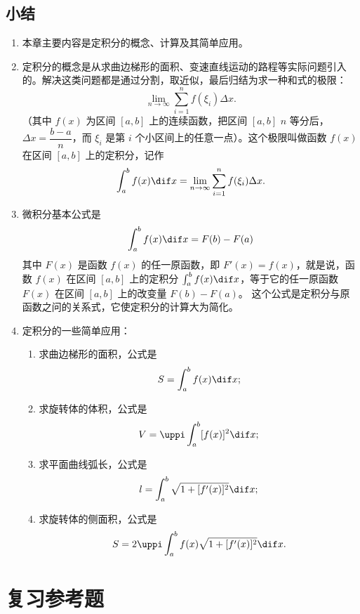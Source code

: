 \section*{小结}
\begin{enumerate}[C、,itemindent=4.5em]
  \item 本章主要内容是定积分的概念、计算及其简单应用。
  \item 定积分的概念是从求曲边梯形的面积、变速直线运动的路程等实际问题引入的。解决这类问题都是通过分割，取近似，最后归结为求一种和式的极限：
  \[ \lim_{n \to \infty}\sum_{i=1}^{n} f(\xi_i)\Delta x. \]
  （其中 $f(x)$ 为区间 $[a,b]$ 上的连续函数，把区间 $[a,b]$ $n$ 等分后，$\Delta x= \dfrac{b-a}{n}$，而 $\xi_i$ 是第 $i$ 个小区间上的任意一点）。这个极限叫做函数 $f(x)$ 在区间 $[a,b]$ 上的定积分，记作
  \[\int_a^b f(x)\dif x=\lim_{n\to\infty}\sum_{i=1}^{n} f(\xi_i)\Delta x.\]
  \item 微积分基本公式是
  \[\int_a^b f(x) \dif x= F(b)-F(a)\]
  其中 $F(x)$ 是函数 $f(x)$ 的任一原函数，即 $F'(x)=f(x)$，就是说，函数 $f(x)$ 在区间 $[a,b]$ 上的定积分 $\int_a^b f(x)\dif x$，等于它的任一原函数 $F(x)$ 在区间 $[a,b]$ 上的改变量 $F(b)-F(a)$。
  这个公式是定积分与原函数之问的关系式，它使定积分的计算大为简化。
  \item 定积分的一些简单应用：
  \begin{enumerate}[1.]
    \item 求曲边梯形的面积，公式是
    \[S=\int_a^b f(x)\dif x;\]
    \item 求旋转体的体积，公式是
    \[V=\uppi\int_a^b [f(x)]^2\dif x;\]
    \item 求平面曲线弧长，公式是
    \[l=\int_a^b \sqrt{1+[f'(x)]^2}\dif x;\]
    \item 求旋转体的侧面积，公式是
    \[S=2\uppi\int_a^b f(x)\sqrt{1+[f'(x)]^2}\dif x.\]
  \end{enumerate}
\end{enumerate}

\chapter*{复习参考题}
